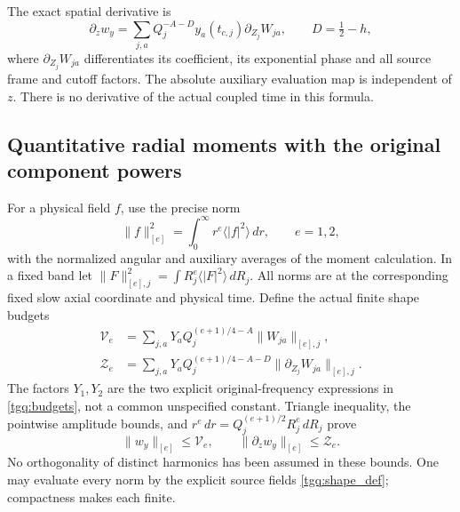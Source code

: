\documentclass[11pt]{article}
\begin{document}
The exact spatial derivative is
\[
 \partial_zw_y=\sum_{j,a}Q_j^{-A-D}y_a(t_{c,j})
          \partial_{Z_j}W_{ja},\qquad D=\tfrac12-h,
\]
where $\partial_{Z_j}W_{ja}$ differentiates its coefficient,
its exponential phase and all source frame and cutoff factors.
The absolute auxiliary evaluation map is independent of $z$.
There is no derivative of the actual coupled time in this formula.

\subsection{Quantitative radial moments with the original component powers}
\label{tgq:moment_budgets}
For a physical field $f$, use the precise norm
\[
 \|f\|_{[e]}^2=\int_0^\infty r^e\langle |f|^2\rangle\,dr,
 \qquad e=1,2,
\]
with the normalized angular and auxiliary averages of the moment
calculation. In a fixed band let
$\|F\|_{[e],j}^2=\int R_j^e\langle|F|^2\rangle\,dR_j$.
All norms are at the corresponding fixed slow axial coordinate and
physical time. Define the actual finite shape budgets
\begin{equation}
 \begin{split}
 \mathcal V_e&=
  \sum_{j,a}Y_a Q_j^{(e+1)/4-A}\|W_{ja}\|_{[e],j},\\
 \mathcal Z_e&=
  \sum_{j,a}Y_a Q_j^{(e+1)/4-A-D}
                              \|\partial_{Z_j}W_{ja}\|_{[e],j}.
 \end{split}\label{tgq:shape_budgets}
\end{equation}
The factors $Y_1,Y_2$ are the two explicit original-frequency expressions
in \eqref{tgq:budgets}, not a common unspecified constant. Triangle
inequality, the pointwise amplitude bounds, and
$r^e\,dr=Q_j^{(e+1)/2}R_j^e\,dR_j$ prove
\[
 \|w_y\|_{[e]}\le\mathcal V_e,\qquad
 \|\partial_zw_y\|_{[e]}\le\mathcal Z_e .
\]
No orthogonality of distinct harmonics has been assumed in these bounds.
One may evaluate every norm by the explicit source fields
\eqref{tgq:shape_def}; compactness makes each finite.
\end{document}
